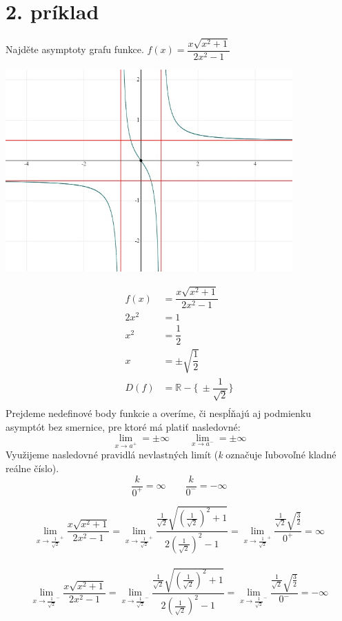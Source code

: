 \documentclass[a4paper]{article}
\begin{document}
	\section*{2. príklad}
	
	
	Najděte asymptoty grafu funkce. $f(x) = \dfrac{x \sqrt{x^2+1}}{2x^2-1}$
	
	\begin{center}
	\includegraphics[width=11cm]{dvojka.jpg}
	\end{center}
	\begin{align*}
	f(x) & = \dfrac{x \sqrt{x^2+1}}{2x^2-1}\\
	2x^2 & = 1\\
	x^2 & = \dfrac{1}{2}\\
	x & = \pm\sqrt{\dfrac{1}{2}}\\
	D(f) & = \mathbb{R} -\{\ \pm \dfrac{1}{\sqrt{2}} \} \\
	\end{align*}
	Prejdeme nedefinové body funkcie a overíme, či nespĺňajú aj podmienku asymptót bez smernice, pre ktoré má platiť nasledovné: 
	\[ \lim_{x \to a^+} = \pm \infty \qquad \lim_{x \to a^-} = \pm \infty\]
	Využijeme nasledovné pravidlá nevlastných limít (\textit{k} označuje ľubovoľné kladné reálne číslo).
	\[ \dfrac{k}{0^+}= \infty \qquad \dfrac{k}{0^-} = -\infty\]
	
	\[ \lim_{x \to {\frac{1}{\sqrt 2}}^+}  \dfrac{x \sqrt{x^2+1}}{2x^2-1} = 
	\lim_{x \to {\frac{1}{\sqrt 2}}^+}  \dfrac{\frac{1}{\sqrt 2} \sqrt{(\frac{1}{\sqrt 2})^2+1}}{2(\frac{1}{\sqrt 2})^2-1} =
	\lim_{x \to {\frac{1}{\sqrt 2}}^+}  \dfrac{\frac{1}{\sqrt 2} \sqrt{\frac{3}{2}}}{0^+} = \infty \]\\
	
	\[ \lim_{x \to {\frac{1}{\sqrt 2}}^-}  \dfrac{x \sqrt{x^2+1}}{2x^2-1} = 
	\lim_{x \to {\frac{1}{\sqrt 2}}^-}  \dfrac{\frac{1}{\sqrt 2} \sqrt{(\frac{1}{\sqrt 2})^2+1}}{2(\frac{1}{\sqrt 2})^2-1} =
	\lim_{x \to {\frac{1}{\sqrt 2}}^-}  \dfrac{\frac{1}{\sqrt 2} \sqrt{\frac{3}{2}}}{0^-} = -\infty \]\\
	
\end{document}
